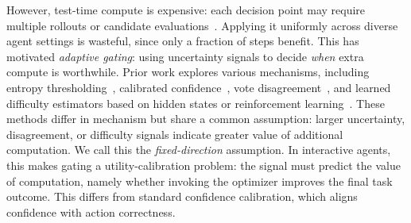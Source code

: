 However, test-time compute is expensive: each decision point may require multiple rollouts or candidate evaluations~\cite{zhou2024lats,yao2023tree}. Applying it uniformly across diverse agent settings is wasteful, since only a fraction of steps benefit. This has motivated \emph{adaptive gating}: using uncertainty signals to decide \emph{when} extra compute is worthwhile. Prior work explores various mechanisms, including entropy thresholding~\cite{seag2025, cats2025, corefine2026}, calibrated confidence~\cite{s1_2025, han2025tokenbudget}, vote disagreement~\cite{catts2026}, and learned difficulty estimators based on hidden states or reinforcement learning~\cite{diffadapt2025, zhu2025llmalreadyknows, adaptthink2025, thinkless2025}. These methods differ in mechanism but share a common assumption: larger uncertainty, disagreement, or difficulty signals indicate greater value of additional computation. We call this the \emph{fixed-direction} assumption. In interactive agents, this makes gating a utility-calibration problem: the signal must predict the value of computation, namely whether invoking the optimizer improves the final task outcome. This differs from standard confidence calibration, which aligns confidence with action correctness.


